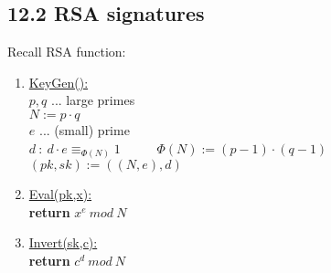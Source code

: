 \documentclass{report}
\begin{document}
	\subsection*{12.2 RSA signatures}
	Recall RSA function:
	\begin{enumerate}[-]
		\item \underline{KeyGen():} \\
		$p, q$ ... large primes \\
		$N := p \cdot q$ \\
		$e$ ... (small) prime \\
		$d \ : \ d \cdot e \equiv_{\Phi(N)} 1$ \ \ \ \ \ $\Phi(N) := (p-1)\cdot (q-1)$ \\
		$(pk,sk) := ((N,e),d)$
		\item \underline{Eval(pk,x):} \\
		\textbf{return} $x^e \ mod \ N$
		\item \underline{Invert(sk,c):} \\
		\textbf{return} $c^d \ mod \ N$
	\end{enumerate}
	
\end{document}

